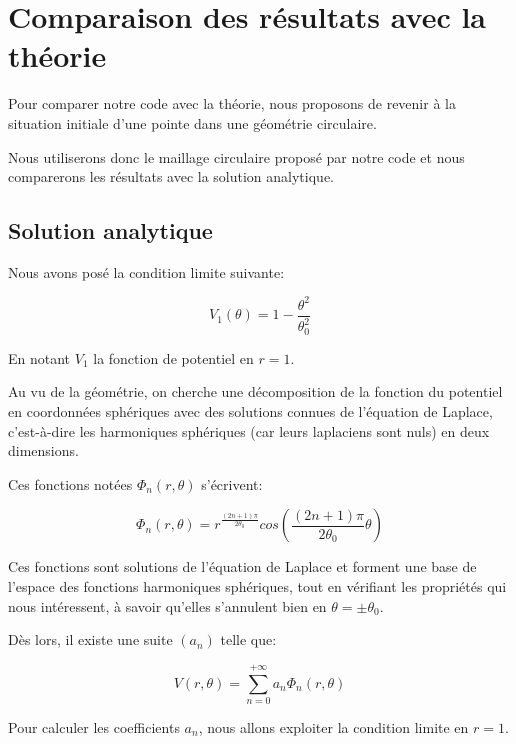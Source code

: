 \documentclass{article}
\begin{document}
\newpage

\section{Comparaison des résultats avec la théorie}

Pour comparer notre code avec la théorie,
nous proposons de revenir à la situation initiale
d'une pointe dans une géométrie circulaire.

Nous utiliserons donc le maillage circulaire proposé
par notre code et nous comparerons les résultats
avec la solution analytique.

\subsection{Solution analytique}

Nous avons posé la condition limite suivante:

\begin{equation}
    V_1(\theta) = 1 - \frac{\theta^2}{\theta_0^2}
\end{equation}

En notant $V_1$ la fonction de potentiel en $r=1$.

Au vu de la géométrie, on cherche une décomposition
de la fonction du potentiel en coordonnées sphériques
avec des solutions connues de l'équation de Laplace,
c'est-à-dire les harmoniques sphériques (car leurs
laplaciens sont nuls) en deux dimensions.

Ces fonctions notées $\Phi_n(r, \theta)$ s'écrivent:

\begin{equation}
    \Phi_n(r, \theta) =
    r^{\frac{(2n+1)\pi}{2 \theta_0}}
    cos\left(\frac{(2n+1)\pi}{2\theta_0}\theta\right)
\end{equation}

Ces fonctions sont solutions de l'équation de Laplace
et forment une base de l'espace des fonctions harmoniques
sphériques, tout en vérifiant les propriétés qui
nous intéressent, à savoir qu'elles s'annulent bien
en $\theta = \pm \theta_0$.

Dès lors, il existe une suite $(a_n)$ telle que:

\begin{equation}
    V(r,\theta) = \sum_{n=0}^{+\infty} a_n \Phi_n(r, \theta)
\end{equation}

Pour calculer les coefficients $a_n$, nous allons exploiter
la condition limite en $r=1$.
\end{document}
